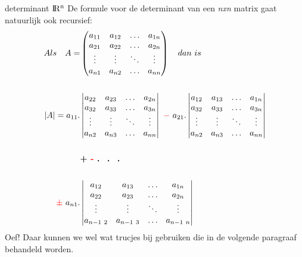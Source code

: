 \mydef
{determinant  ${\rm I\!R^{n}}$}
{De formule voor de determinant van een \textit{nxn} matrix gaat natuurlijk ook recursief:   \begin{align*}
	Als \quad A  = 
	&\begin{pmatrix}
	a_{11} &  a_{12}  & \ldots & a_{1n}\\
	a_{21}  &  a_{22} & \ldots & a_{2n}\\
	\vdots & \vdots & \ddots & \vdots\\
	a_{n1}  &   a_{n2}       &\ldots & a_{nn}
	\end{pmatrix} 	 \quad  dan \  is  \\ \\
	|A| = a_{11} .   	 
	&\begin{vmatrix}
	a_{22}  &  a_{23} & \ldots & a_{2n}\\
	a_{32}  &  a_{33} & \ldots & a_{3n}\\
	\vdots & \vdots & \ddots & \vdots\\
	a_{n2}  &   a_{n3}       &\ldots & a_{nn}
	\end{vmatrix} 
	\ {\color{red}-}  \ a_{21} .   	
	\begin{vmatrix}
	a_{12} &  a_{13}  & \ldots & a_{1n}\\
	a_{32}  &  a_{33} & \ldots & a_{3n}\\
	\vdots & \vdots & \ddots & \vdots\\
	a_{n2}  &   a_{n3}       &\ldots & a_{nn}
	\end{vmatrix} \\ \\
	&\textbf{+ {\color{red}-}  . \  . \ . }\\ \\
	{\color{red}\pm \ } a_{n1} .   
	&\begin{vmatrix}
	a_{12} &  a_{13}  & \ldots & a_{1n}\\
	a_{22}  &  a_{23} & \ldots & a_{2n}\\
	\vdots & \vdots & \ddots & \vdots\\
	a_{n-1 \ 2}  &   a_{n-1 \ 3}       &\ldots & a_{n-1 \ n}
	\end{vmatrix} 
	\end{align*}
}
Oef! Daar kunnen we wel wat trucjes bij gebruiken die in de volgende paragraaf behandeld worden.
